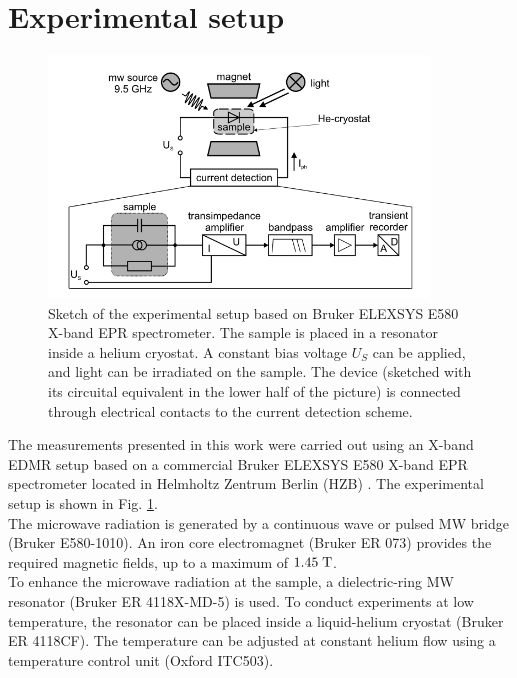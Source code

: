 \documentclass[a4paper]{book}
\begin{document}
	\section{Experimental setup}
	\begin{figure}[t]
		\centering
		\includegraphics[width=0.9\textwidth]{images/3_behrends_exp_setup}
		\caption{Sketch of the experimental setup based on Bruker ELEXSYS E580 X-band EPR spectrometer. The sample is placed in a resonator inside a helium cryostat. A constant bias voltage $U_S$ can be applied, and light can be irradiated on the sample. The device (sketched with its circuital equivalent in the lower half of the picture) is connected through electrical contacts to the current detection scheme. \cite{behrendsSpindependentTransportRecombination2009}}
		\label{fig:3_behrends_exp_setup}
	\end{figure}
	The measurements presented in this work were carried out using an X-band EDMR setup based on a commercial Bruker ELEXSYS E580 X-band EPR spectrometer located in Helmholtz Zentrum Berlin (HZB) \cite{moserChargeTransportAmorphous2019}. The experimental setup is shown in Fig. \ref{fig:3_behrends_exp_setup}.\\
	The microwave radiation is generated by a continuous wave or pulsed MW bridge (Bruker E580-1010). An iron core electromagnet (Bruker ER 073) provides the required magnetic fields, up to a maximum of $1.45 \; \text T$. \\
	To enhance the microwave radiation at the sample, a dielectric-ring MW resonator (Bruker ER 4118X-MD-5) is used. To conduct experiments at low temperature, the resonator can be placed inside a liquid-helium cryostat (Bruker ER 4118CF). The temperature can be adjusted at constant helium flow using a temperature control unit (Oxford ITC503).\\
\end{document}
